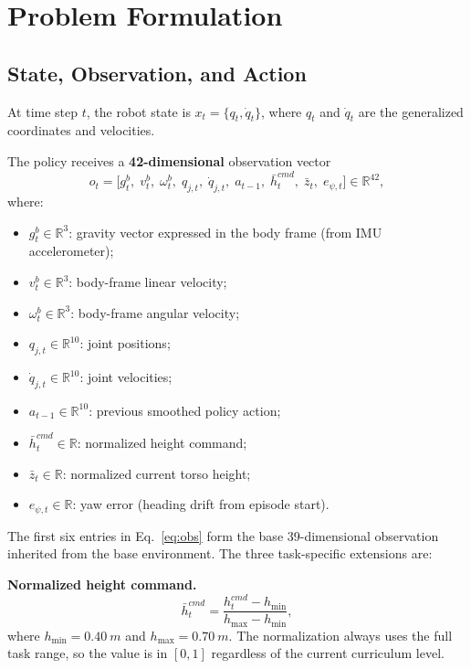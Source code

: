 \documentclass[conference]{IEEEtran}
\begin{document}
\section{Problem Formulation}

\subsection{State, Observation, and Action}
At time step $t$, the robot state is $x_t = \{q_t, \dot{q}_t\}$,
where $q_t$ and $\dot{q}_t$ are the generalized coordinates
and velocities.

The policy receives a \textbf{42-dimensional} observation vector
\begin{equation}
o_t = \big[
  g_t^b,\;
  v_t^b,\;
  \omega_t^b,\;
  q_{j,t},\;
  \dot{q}_{j,t},\;
  a_{t-1},\;
  \bar{h}_t^{cmd},\;
  \bar{z}_t,\;
  e_{\psi,t}
\big] \in \mathbb{R}^{42},
\label{eq:obs}
\end{equation}
where:
\begin{itemize}
    \item $g_t^b \in \mathbb{R}^3$: gravity vector expressed in the
    body frame (from IMU accelerometer);
    \item $v_t^b \in \mathbb{R}^3$: body-frame linear velocity;
    \item $\omega_t^b \in \mathbb{R}^3$: body-frame angular velocity;
    \item $q_{j,t} \in \mathbb{R}^{10}$: joint positions;
    \item $\dot{q}_{j,t} \in \mathbb{R}^{10}$: joint velocities;
    \item $a_{t-1} \in \mathbb{R}^{10}$: previous smoothed policy action;
    \item $\bar{h}_t^{cmd} \in \mathbb{R}$: normalized height command;
    \item $\bar{z}_t \in \mathbb{R}$: normalized current torso height;
    \item $e_{\psi,t} \in \mathbb{R}$: yaw error (heading drift from
    episode start).
\end{itemize}

The first six entries in Eq.~\eqref{eq:obs} form the base
39-dimensional observation inherited from the base environment.
The three task-specific extensions are:

\noindent\textbf{Normalized height command.}
\begin{equation}
\bar{h}_t^{cmd} = \frac{h_t^{cmd} - h_{\min}}{h_{\max} - h_{\min}},
\label{eq:height_norm}
\end{equation}
where $h_{\min} = \SI{0.40}{m}$ and $h_{\max} = \SI{0.70}{m}$.
The normalization always uses the full task range, so the value is in
$[0, 1]$ regardless of the current curriculum level.
\end{document}
